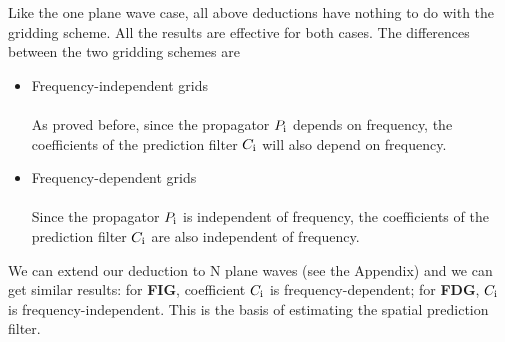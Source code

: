 Like the one plane wave case, all above deductions have nothing to do with the 
gridding scheme. All the results are effective for both cases. The differences 
between the two gridding schemes are
\begin{itemize}

	\item Frequency-independent grids\\ \\
	As proved before, since the propagator $P_{\rm i}$ depends on 
	frequency, the coefficients of the prediction filter $C_{\rm i}$ will 
	also depend on frequency.

	\item Frequency-dependent grids\\ \\
	Since the propagator $P_{\rm i}$ is independent of frequency, the 
	coefficients of the prediction filter $C_{\rm i}$ are also independent 
	of frequency.

\end{itemize} 

We can extend our deduction to N plane waves (see the Appendix) and we can get 
similar results: for {\bf FIG}, coefficient $C_{\rm i}$ is frequency-dependent;
 for {\bf FDG}, $C_{\rm i}$ is frequency-independent. This is the basis of 
estimating the spatial prediction filter.


